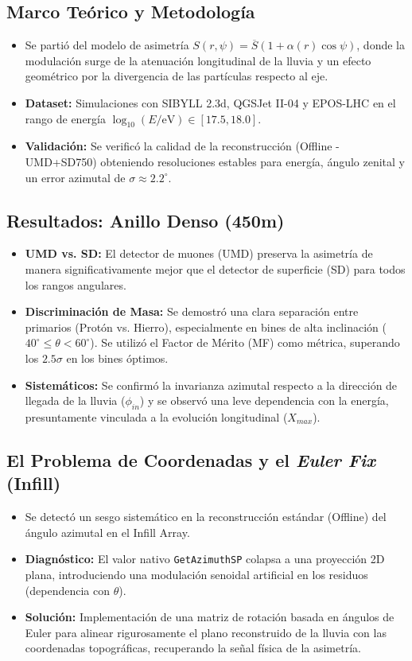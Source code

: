 \subsection{Marco Teórico y Metodología}
\begin{itemize}
	\item Se partió del modelo de asimetría $S(r,\psi)=\overline{S}(1+\alpha(r)\cos\psi)$, donde la modulación surge de la atenuación longitudinal de la lluvia y un efecto geométrico por la divergencia de las partículas respecto al eje.
	\item \textbf{Dataset:} Simulaciones con SIBYLL 2.3d, QGSJet II-04 y EPOS-LHC en el rango de energía $\log_{10}(E/\text{eV}) \in [17.5, 18.0]$.
	\item \textbf{Validación:} Se verificó la calidad de la reconstrucción (Offline - UMD+SD750) obteniendo resoluciones estables para energía, ángulo zenital y un error azimutal de $\sigma \approx 2.2^\circ$.
\end{itemize}

\subsection{Resultados: Anillo Denso (450m)}
\begin{itemize}
	\item \textbf{UMD vs. SD:} El detector de muones (UMD) preserva la asimetría de manera significativamente mejor que el detector de superficie (SD) para todos los rangos angulares.
	\item \textbf{Discriminación de Masa:} Se demostró una clara separación entre primarios (Protón vs. Hierro), especialmente en bines de alta inclinación ($40^\circ \le \theta < 60^\circ$). Se utilizó el Factor de Mérito (MF) como métrica, superando los $2.5\sigma$ en los bines óptimos.
	\item \textbf{Sistemáticos:} Se confirmó la invarianza azimutal respecto a la dirección de llegada de la lluvia ($\phi_{in}$) y se observó una leve dependencia con la energía, presuntamente vinculada a la evolución longitudinal ($X_{max}$).
\end{itemize}

\subsection{El Problema de Coordenadas y el \textit{Euler Fix} (Infill)}
\begin{itemize}
	\item Se detectó un sesgo sistemático en la reconstrucción estándar (Offline) del ángulo azimutal en el Infill Array.
	\item \textbf{Diagnóstico:} El valor nativo \texttt{GetAzimuthSP} colapsa a una proyección 2D plana, introduciendo una modulación senoidal artificial en los residuos (dependencia con $\theta$).
	\item \textbf{Solución:} Implementación de una matriz de rotación basada en ángulos de Euler para alinear rigurosamente el plano reconstruido de la lluvia con las coordenadas topográficas, recuperando la señal física de la asimetría.
\end{itemize}

